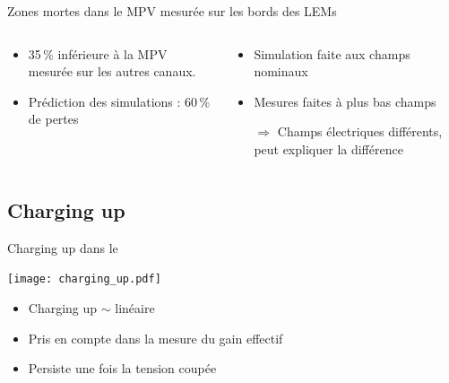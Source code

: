 \begin{frame}{Zones mortes dans le \TOO{}}{MPV mesurée sur les bords des LEMs}
\begin{scriptsize}
\begin{columns}
\begin{column}{0.5\textwidth}
                \end{column}
            \end{columns}
            \begin{columns}
                \begin{column}{0.5\textwidth}
                    \begin{itemize}
                        \item 35\,\% inférieure à la MPV mesurée sur les autres canaux.
                        \item Prédiction des simulations : 60\,\% de pertes
                    \end{itemize}
                \end{column}
                \begin{column}{0.5\textwidth}
                    \begin{itemize}
                        \item Simulation faite aux champs nominaux
                        \item Mesures faites à plus bas champs
                        \item[$\Rightarrow$] Champs électriques différents, peut expliquer la différence 
                    \end{itemize}
                \end{column}
            \end{columns}
        \end{scriptsize}
    \end{frame}

    \subsection{Charging up}
    \begin{frame}{Charging up dans le \TOO{}}
        \begin{scriptsize}
            \texttt{[image: charging\_up.pdf]}
            \begin{itemize}
                \item Charging up $\sim$ linéaire
                \item Pris en compte dans la mesure du gain effectif
                \item Persiste une fois la tension coupée
            \end{itemize}
        \end{scriptsize}
    \end{frame}
    
